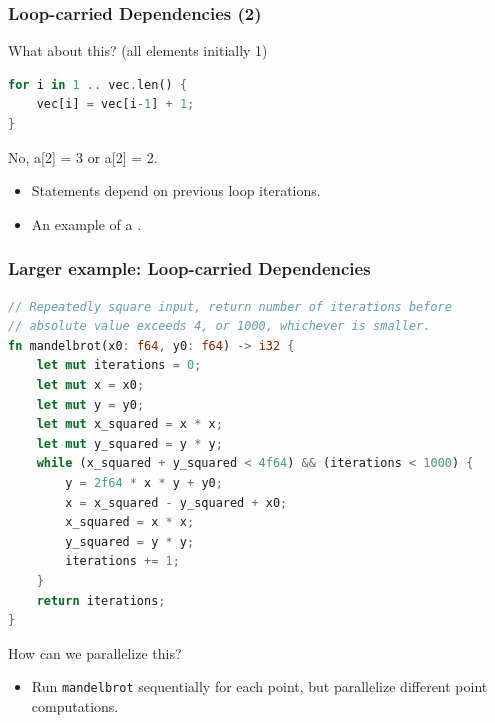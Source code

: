 \begin{frame}[fragile]
\frametitle{Loop-carried Dependencies (2)}

What about this? (all elements initially 1)
\begin{lstlisting}[language=Rust]
for i in 1 .. vec.len() {
    vec[i] = vec[i-1] + 1;
}
\end{lstlisting}

\pause
\alert{No, a[2] = 3 or a[2] = 2.}\\[1em]
\begin{itemize}
\item Statements depend on previous loop iterations.
\item An example of a .
\end{itemize}

\end{frame}


\begin{frame}[fragile]
\frametitle{Larger example: Loop-carried Dependencies}
{\small
\begin{lstlisting}[language=Rust]
// Repeatedly square input, return number of iterations before
// absolute value exceeds 4, or 1000, whichever is smaller.
fn mandelbrot(x0: f64, y0: f64) -> i32 {
    let mut iterations = 0;
    let mut x = x0;
    let mut y = y0;
    let mut x_squared = x * x;
    let mut y_squared = y * y;
    while (x_squared + y_squared < 4f64) && (iterations < 1000) {
        y = 2f64 * x * y + y0;
        x = x_squared - y_squared + x0;
        x_squared = x * x;
        y_squared = y * y;
        iterations += 1;
    }
    return iterations;
}
\end{lstlisting}
}
How can we parallelize this? \\
\pause
\begin{itemize}
\item Run {\tt mandelbrot} sequentially for each point, but parallelize
different point computations.
\end{itemize}
\end{frame}


